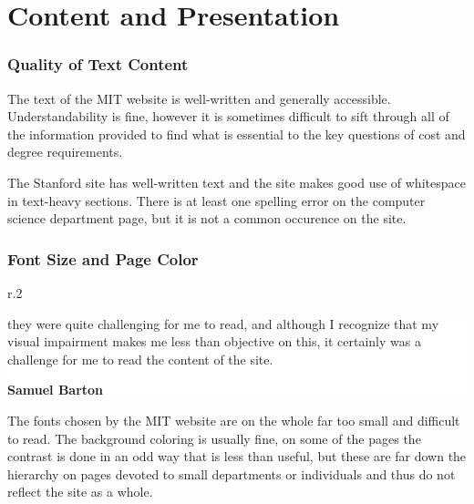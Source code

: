 \section*{Content and Presentation}

\subsubsection*{Quality of Text Content}

The text of the MIT website is well-written and generally accessible. Understandability is
fine, however it is sometimes difficult to sift through all of the information provided to
find what is essential to the key questions of cost and degree requirements.

The Stanford site has well-written text and the site makes good use of whitespace
in text-heavy sections. There is at least one spelling error on the computer science
department page, but it is not a common occurence on the site.

\subsubsection*{Font Size and Page Color}



\linespread{1.0}
\begin{wrapfigure}[6]{r}{.2\textwidth}
\colorbox{white}{\begin{minipage}{0.25\textwidth}\begin{scriptsize}\begin{center}
			 	   they were quite challenging for me to read, and although I recognize that my visual impairment makes me less 
				   than objective on this, it certainly was a challenge for me to read the content of the site.\par
				   
				   \textbf{Samuel Barton}\end{center}\end{scriptsize}
\end{minipage}}
\end{wrapfigure}

\linespread{1.3}
		The fonts chosen by the MIT website are on the whole far too small and difficult to read.
		The background coloring is usually fine, on some of the pages the contrast is done in an
		odd way that is less than useful, but these are far down the hierarchy on pages devoted to
		small departments or individuals and thus do not reflect the site as a whole.


